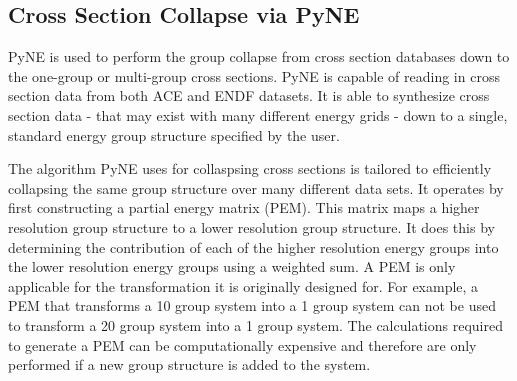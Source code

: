 \documentclass{article}
\begin{document}
\subsection{Cross Section Collapse via PyNE}
PyNE is used to perform the group collapse
from cross section databases down to the one-group or multi-group cross sections.
PyNE is capable of reading in cross section data from both ACE\cite{ace} and ENDF\cite{endf}
datasets. It is able to synthesize cross section data - that may exist with
many different energy grids - down to a single, standard energy group structure specified
by the user.

The algorithm PyNE uses for collaspsing cross sections is tailored to efficiently collapsing
the same group structure over many different data sets.
It operates by first constructing a partial energy matrix (PEM). This matrix maps a higher
resolution group structure to a lower resolution group structure. It does this by determining
the contribution of each of the higher resolution energy groups into the lower resolution
energy groups using a weighted sum. A PEM is only applicable for the transformation it is
originally designed for. For example, a PEM that transforms a 10 group system into a
1 group system can not be used to transform a 20 group system into a 1 group system.
The calculations required to generate a PEM can be computationally expensive
and therefore are only performed if a new group structure is added to the system.
\end{document}
